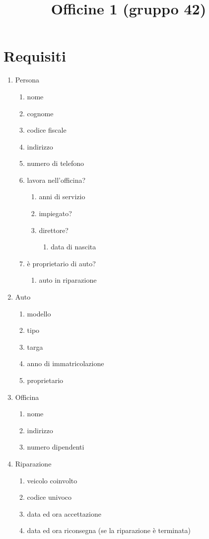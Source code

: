 \documentclass[12pt, letterpaper]{article}
\title{Officine 1 (gruppo 42)}
\date{}
\begin{document}
\maketitle


\section{Requisiti}
\begin{enumerate}
    \item Persona \begin{enumerate}
        \item nome 
        \item cognome
        \item codice fiscale 
        \item indirizzo 
        \item numero di telefono
        \item lavora nell'officina?\begin{enumerate}\item anni di servizio
            \item impiegato?
            \item direttore? \begin{enumerate}
                \item data di nascita
            \end{enumerate}
        \end{enumerate}
        \item è proprietario di auto?\begin{enumerate}
            \item auto in riparazione
        \end{enumerate}
    \end{enumerate}
    \item Auto\begin{enumerate}
        \item modello 
        \item tipo 
        \item targa 
        \item anno di immatricolazione 
        \item proprietario
    \end{enumerate}
    \item Officina \begin{enumerate}
        \item nome 
        \item indirizzo 
        \item numero dipendenti
    \end{enumerate}
    \item Riparazione\begin{enumerate}
        \item veicolo coinvolto 
        \item codice univoco 
        \item data ed ora accettazione 
        \item data ed ora riconsegna (se la riparazione è terminata) 
    \end{enumerate}
\end{enumerate}
\newpage
\end{document}
